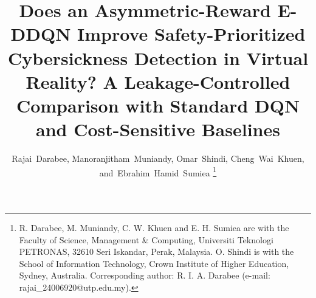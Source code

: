 \documentclass[journal]{IEEEtran}
\begin{document}
\title{Does an Asymmetric-Reward E-DDQN Improve Safety-Prioritized Cybersickness Detection in Virtual Reality? A Leakage-Controlled Comparison with Standard DQN and Cost-Sensitive Baselines}

\author{Rajai~Darabee,
        Manoranjitham~Muniandy,
        Omar~Shindi,
        Cheng~Wai~Khuen,
        and~Ebrahim~Hamid~Sumiea
\thanks{R. Darabee, M. Muniandy, C. W. Khuen and E. H. Sumiea are with the Faculty of Science, Management \& Computing, Universiti Teknologi PETRONAS, 32610 Seri Iskandar, Perak, Malaysia. O. Shindi is with the School of Information Technology, Crown Institute of Higher Education, Sydney, Australia. Corresponding author: R. I. A. Darabee (e-mail: rajai\_24006920@utp.edu.my).}}

\maketitle














\end{document}

